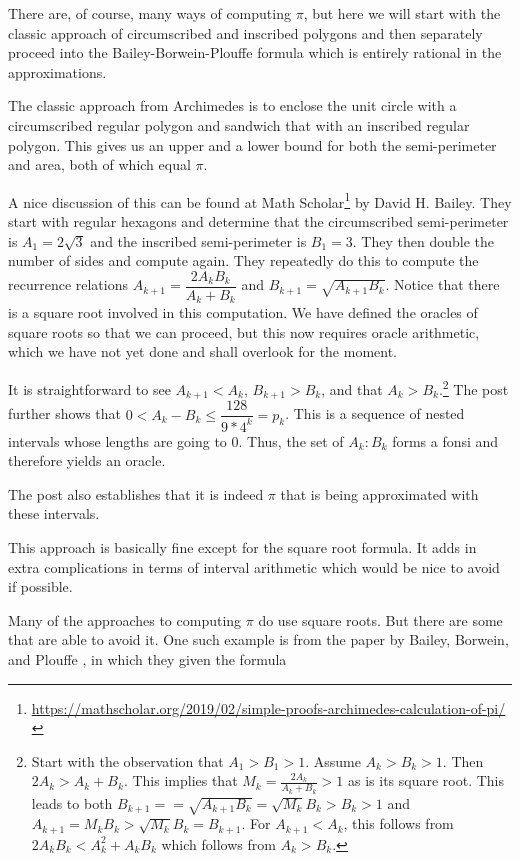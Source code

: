 \documentclass[12pt]{article}
\begin{document}
There are, of course, many ways of computing $\pi$, but here we will start with the classic approach of circumscribed and inscribed polygons and then separately proceed into the Bailey-Borwein-Plouffe formula which is entirely rational in the approximations. 

The classic approach from Archimedes is to enclose the unit circle with a circumscribed regular polygon and sandwich that with an inscribed regular polygon. This gives us an upper and a lower bound for both the semi-perimeter and area, both of which equal $\pi$. 

A nice discussion of this can be found at Math Scholar\footnote{\url{https://mathscholar.org/2019/02/simple-proofs-archimedes-calculation-of-pi/}} by David H. Bailey. They start with regular hexagons and determine that the circumscribed semi-perimeter is $A_1 = 2 \sqrt{3}$ and the inscribed semi-perimeter is $B_1 = 3$. They then double the number of sides and compute again. They repeatedly do this to compute the recurrence relations $A_{k+1} = \dfrac{2A_k B_k}{A_k + B_k}$ and $B_{k+1} = \sqrt{A_{k+1}B_k}$. Notice that there is a square root involved in this computation. We have defined the oracles of square roots so that we can proceed, but this now requires oracle arithmetic, which we have not yet done and shall overlook for the moment.  

It is straightforward to see $A_{k+1} < A_k$, $B_{k+1} > B_k$, and that $A_k > B_k$.\footnote{Start with the observation that $A_1 > B_1 > 1$. Assume $A_k > B_k > 1$. Then $2 A_k  > A_k + B_k$. This implies that $M_k = \frac{2A_k}{A_k + B_k}>1$ as is its square root. This leads to both $B_{k+1} =  = \sqrt{A_{k+1} B_k} = \sqrt{M_k} B_k > B_k > 1$  and $A_{k+1} = M_k B_k > \sqrt{M_k} B_k = B_{k+1}$.  For $A_{k+1} < A_k$, this follows from $2A_k B_k < A_k^2 + A_kB_k$ which follows from $A_k > B_k$.} The post further shows that $0 < A_k - B_k \leq \dfrac{128}{9*4^k} = p_k $. This is a sequence of nested intervals whose lengths are going to 0. Thus, the set of $A_k:B_k$ forms a fonsi and therefore yields an oracle. 

The post also establishes that it is indeed $\pi$ that is being approximated with these intervals.

This approach is basically fine except for the square root formula. It adds in extra complications in terms of interval arithmetic which would be nice to avoid if possible. 

Many of the approaches to computing $\pi$ do use square roots. But there are some that are able to avoid it. One such example is from the paper by Bailey, Borwein, and Plouffe \cite{BBP}, in which they given the formula 
\end{document}
